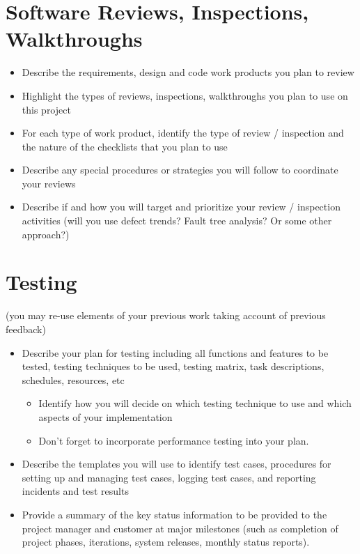 \documentclass[11pt]{report}
\begin{document}
\chapter{Software Reviews, Inspections, Walkthroughs}
\begin{itemize}
\item Describe the requirements, design and code work products you plan to review
\item Highlight the types of reviews, inspections, walkthroughs you plan to use on this project
\item For each type of work product, identify the type of review / inspection and the nature of the
  checklists that you plan to use
\item Describe any special procedures or strategies you will follow to coordinate your reviews
\item Describe if and how you will target and prioritize your review / inspection activities (will
  you use defect trends? Fault tree analysis? Or some other approach?)
\end{itemize}



\chapter{Testing}
(you may re-use elements of your previous work taking account of previous feedback)
\begin{itemize}
\item Describe your plan for testing including all functions and features to be tested, testing
  techniques to be used, testing matrix, task descriptions, schedules, resources, etc
  \begin{itemize}
  \item Identify how you will decide on which testing technique to use and which aspects of your
    implementation
  \item Don’t forget to incorporate performance testing into your plan.
  \end{itemize}
\item Describe the templates you will use to identify test cases, procedures for setting up and
  managing test cases, logging test cases, and reporting incidents and test results
\item Provide a summary of the key status information to be provided to the project manager and
  customer at major milestones (such as completion of project phases, iterations, system releases,
  monthly status reports).
\end{itemize}
\end{document}
